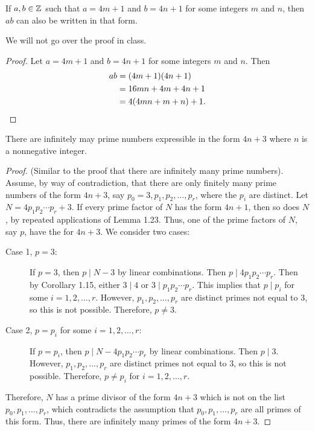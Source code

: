 \documentclass[letterpaper, 11 pt]{ximera}
\begin{document}
\begin{lem}[Lemma 1.23]
 If $a,b\in\mathbb Z$ such that $a=4m+1$ and $b=4n+1$ for some integers $m$ and $n$, then $ab$ can also be written in that form.
\end{lem}
We will not go over the proof in class.
\begin{proof}
 Let $a=4m+1$ and $b=4n+1$ for some integers $m$ and $n$. Then 
\begin{align*}
ab&=(4m+1)(4n+1)\\
&=16mn+4m+4n+1\\
&=4(4mn+m+n)+1.\qedhere
\end{align*}
\end{proof}

\begin{prop}[Proposition 1.22]
 There are infinitely may prime numbers expressible in the form $4n+3$ where $n$ is a nonnegative integer.
\end{prop}
\begin{proof}
 (Similar to the proof that there are infinitely many prime numbers). Assume, by way of contradiction, that there are only finitely many prime numbers of the form $4n+3$, say $p_0=3, p_1,p_2,\dots, p_r$, where the $p_i$ are distinct. Let $N=4p_1 p_2 \cdots p_r+3$. If every prime factor of $N$ has the form $4n+1$, then so does $N$, by repeated applications of Lemma 1.23. Thus, one of the prime factors of $N$, say $p$, have the for $4n+3$. We consider two cases:
 
\begin{description}
 \item[Case 1, $p=3$:] If $p=3$, then $p\mid N-3$ by linear combinations. Then $p\mid 4 p_1p_2\cdots p_r$. Then by Corollary 1.15, either $3\mid 4$ or $3\mid p_1p_2\cdots p_r$. This implies that $p\mid p_i$ for some $i=1,2,\dots,r$. However, $p_1,p_2,\dots,p_r$ are distinct primes not equal to $3$, so this is not possible. Therefore, $p\neq 3$.
 
 \item[Case 2, $p=p_i$ for some $i=1,2,\dots, r$:] If $p=p_i$, then $p\mid N-4p_1p_2\cdots p_r$ by linear combinations. Then $p\mid 3$. However, $p_1,p_2,\dots,p_r$ are distinct primes not equal to $3$, so this is not possible. Therefore, $p\neq p_i$ for $i=1,2,\dots,r$.
\end{description}
Therefore, $N$ has a prime divisor of the form $4n+3$ which is not on the list $p_0,p_1,\dots,p_r$, which contradicts the assumption that $p_0,p_1,\dots,p_r$ are all primes of this form. Thus, there are infinitely many primes of the form $4n+3$.
\end{proof}
\end{document}
